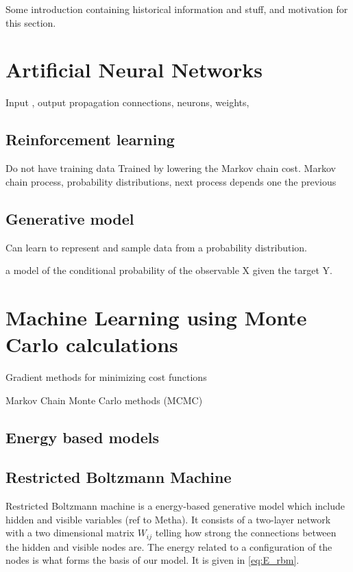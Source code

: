 Some introduction containing historical information and stuff, and motivation for this section.

\section{Artificial Neural Networks}

Input , output propagation
connections, neurons, weights, 

\subsection{Reinforcement learning}

Do not have training data
Trained by lowering the Markov chain cost.
Markov chain process, probability distributions, next process depends one the previous


\subsection{Generative model}

Can learn to represent and sample data from a probability distribution.

a model of the conditional probability of the observable X given the target Y. 

\section{Machine Learning using Monte Carlo calculations}

Gradient methods for minimizing cost functions

Markov Chain Monte Carlo methods (MCMC)

\subsection{Energy based models}

\subsection{Restricted Boltzmann Machine}\label{sec:rbm}

Restricted Boltzmann machine is a energy-based generative model which include hidden and visible variables (ref to Metha). It consists of a two-layer network with a two dimensional matrix $W_{ij}$ telling how strong the connections between the hidden and visible nodes are. The energy related to a configuration of the nodes is what forms the basis of our model. It is given in \eqref{eq:E_rbm}.


